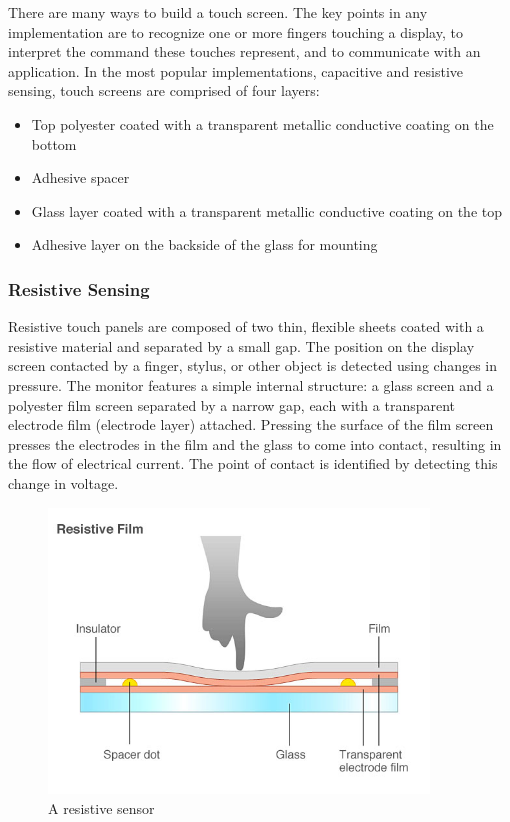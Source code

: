 \documentclass[11pt]{report}
\begin{document}
There are many ways to build a touch screen.
The key points in any implementation are to recognize one or more fingers touching a display, to interpret the command these touches represent, and to communicate with an application.
In the most popular implementations, capacitive and resistive sensing, touch screens are comprised of four layers:

\begin{itemize}
\item Top polyester coated with a transparent metallic conductive coating on the bottom
\item Adhesive spacer
\item Glass layer coated with a transparent metallic conductive coating on the top
\item Adhesive layer on the backside of the glass for mounting
\end{itemize}

\subsubsection{Resistive Sensing}
Resistive touch panels are composed of two thin, flexible sheets coated with a resistive material and separated by a small gap.
The position on the display screen contacted by a finger, stylus, or other object is detected using changes in pressure. 
The monitor features a simple internal structure: a glass screen and a polyester film screen separated by a narrow gap, each with a transparent electrode film (electrode layer) attached. 
Pressing the surface of the film screen presses the electrodes in the film and the glass to come into contact, resulting in the flow of electrical current. 
The point of contact is identified by detecting this change in voltage.

\begin{center}
\begin{figure}
\includegraphics[width=0.9\textwidth]{resistive}
\caption{A resistive sensor}
\end{figure}
\end{center}
\end{document}
